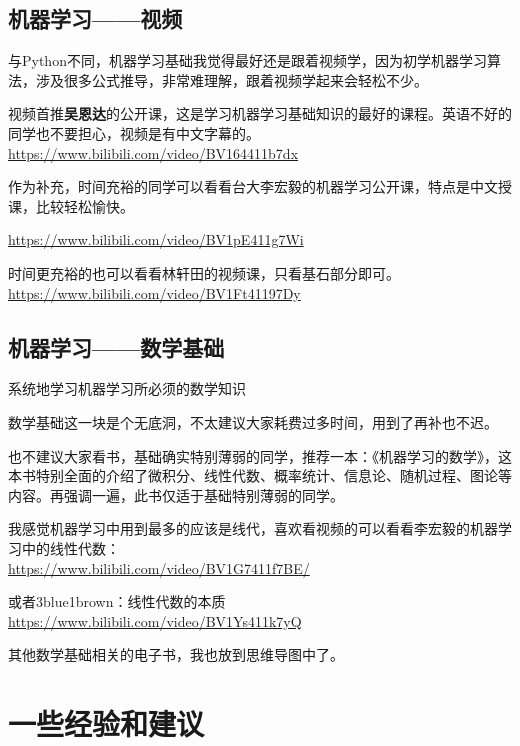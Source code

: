 \documentclass[]{ctexbook}
\begin{document}
\hypertarget{ux673aux5668ux5b66ux4e60ux89c6ux9891}{%
\subsection{机器学习------视频}\label{ux673aux5668ux5b66ux4e60ux89c6ux9891}}

与Python不同，机器学习基础我觉得最好还是跟着视频学，因为初学机器学习算法，涉及很多公式推导，非常难理解，跟着视频学起来会轻松不少。

视频首推\textbf{吴恩达}的公开课，这是学习机器学习基础知识的最好的课程。英语不好的同学也不要担心，视频是有中文字幕的。\\
\url{https://www.bilibili.com/video/BV164411b7dx}

作为补充，时间充裕的同学可以看看台大李宏毅的机器学习公开课，特点是中文授课，比较轻松愉快。

\url{https://www.bilibili.com/video/BV1pE411g7Wi}

时间更充裕的也可以看看林轩田的视频课，只看基石部分即可。\\
\url{https://www.bilibili.com/video/BV1Ft41197Dy}

\hypertarget{ux673aux5668ux5b66ux4e60ux6570ux5b66ux57faux7840}{%
\subsection{机器学习------数学基础}\label{ux673aux5668ux5b66ux4e60ux6570ux5b66ux57faux7840}}

系统地学习机器学习所必须的数学知识

数学基础这一块是个无底洞，不太建议大家耗费过多时间，用到了再补也不迟。

也不建议大家看书，基础确实特别薄弱的同学，推荐一本：《机器学习的数学》，这本书特别全面的介绍了微积分、线性代数、概率统计、信息论、随机过程、图论等内容。再强调一遍，此书仅适于基础特别薄弱的同学。

我感觉机器学习中用到最多的应该是线代，喜欢看视频的可以看看李宏毅的机器学习中的线性代数：\\
\url{https://www.bilibili.com/video/BV1G7411f7BE/}

或者3blue1brown：线性代数的本质\\
\url{https://www.bilibili.com/video/BV1Ys411k7yQ}

其他数学基础相关的电子书，我也放到思维导图中了。

\hypertarget{ux4e00ux4e9bux7ecfux9a8cux548cux5efaux8bae}{%
\section{一些经验和建议}\label{ux4e00ux4e9bux7ecfux9a8cux548cux5efaux8bae}}
\end{document}
